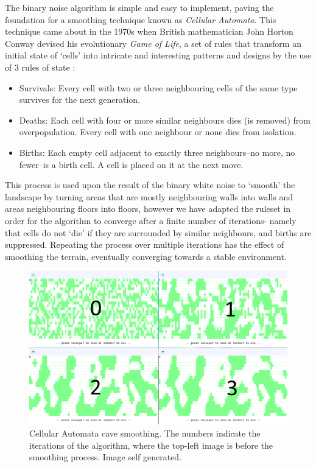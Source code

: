 \documentclass[12pt,a4paper]{article}
\begin{document}
The binary noise algorithm is simple and easy to implement, paving the foundation for a smoothing technique known as \emph{Cellular Automata}. This technique came about in the 1970s when British mathematician John Horton Conway devised his evolutionary \emph{Game of Life}, a set of rules that transform an initial state of `cells' into intricate and interesting patterns and designs by the use of 3 rules of state \cite{cellauto}:

\begin{itemize}
	\item Survivals: Every cell with two or three neighbouring cells of the same type survives for the next generation.
	\item Deaths: Each cell with four or more similar neighbours dies (is removed) from overpopulation. Every cell with one neighbour or none dies from isolation.
	\item Births: Each empty cell adjacent to exactly three neighbours--no more, no fewer--is a birth cell. A cell is placed on it at the next move.
\end{itemize}

This process is used upon the result of the binary white noise to `smooth' the landscape by turning areas that are mostly neighbouring walls into walls and areas neighbouring floors into floors, however we have adapted the ruleset in order for the algorithm to converge after a finite number of iterations- namely that cells do not `die' if they are surrounded by similar neighbours, and births are suppressed. Repeating the process over multiple iterations has the effect of smoothing the terrain, eventually converging towards a stable environment. 


\begin{figure}[ht]
  \centering
 	\includegraphics[scale=0.5]{images/cellauto.png}
	\caption[]{Cellular Automata cave smoothing. The numbers indicate the iterations of the algorithm, where the top-left image is before the smoothing process. Image self generated.}
	\label{fig:2}
\end{figure} 
\end{document}
